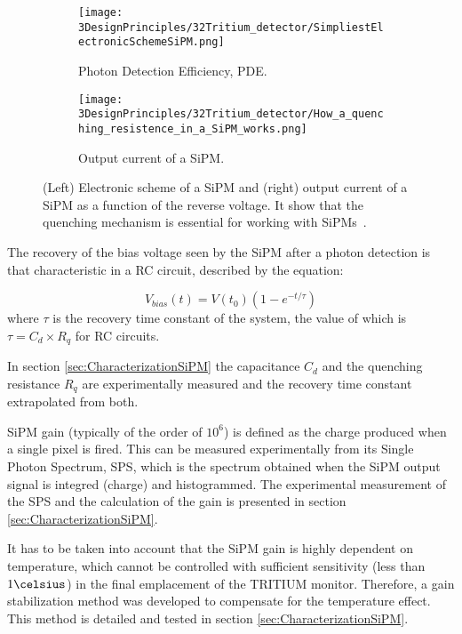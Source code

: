 \begin{figure}
\centering
    \begin{subfigure}[b]{0.45\textwidth}
    \centering
    \texttt{[image: 3DesignPrinciples/32Tritium\_detector/SimpliestElectronicSchemeSiPM.png]}  
    \caption{Photon Detection Efficiency, PDE.\label{subfig:ElectricModelSiPM}}
    \end{subfigure}
    \hfill
    \begin{subfigure}[b]{0.45\textwidth}
    \centering
    \texttt{[image: 3DesignPrinciples/32Tritium\_detector/How\_a\_quenching\_resistence\_in\_a\_SiPM\_works.png]}  
    \caption{Output current of a SiPM.\label{subfig:HowSiPMworks}}
    \end{subfigure}
 \caption{(Left) Electronic scheme of a SiPM and (right) output current of a SiPM as a function of the reverse voltage. It show that the quenching mechanism is essential for working with SiPMs~\cite{DataSheetSensL}.}
 \label{fig:ChenchingResistance}
\end{figure}

The recovery of the bias voltage seen by the SiPM after a photon detection is that characteristic in a RC circuit, described by the equation: 

\begin{equation}
V_{bias}(t)=V(t_0)\left(1-e^{-t/\tau} \right)
\label{RCCircuitBiasVoltage}
\end{equation}
where $\tau$ is the recovery time constant of the system, the value of which is $\tau=C_d \times R_q$ for RC circuits.

In section \ref{sec:CharacterizationSiPM} the capacitance $C_d$ and the quenching resistance $R_q$ are experimentally measured and the recovery time constant extrapolated from both.

SiPM gain (typically of the order of $10^6$) is defined as the charge produced when a single pixel is fired. This can be measured experimentally from its Single Photon Spectrum, SPS, which is the spectrum obtained when the SiPM output signal is integred (charge) and histogrammed. The experimental measurement of the SPS and the calculation of the gain is presented in section \ref{sec:CharacterizationSiPM}.

It has to be taken into account that the SiPM gain is highly dependent on temperature, which cannot be controlled with sufficient sensitivity (less than $1\celsius$) in the final emplacement of the TRITIUM monitor. Therefore, a gain stabilization method was developed to compensate for the temperature effect. This method is detailed and tested in section \ref{sec:CharacterizationSiPM}.


